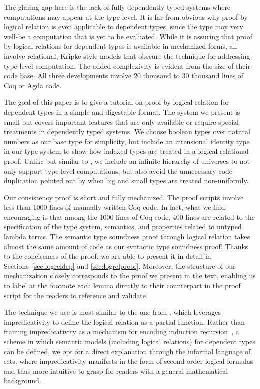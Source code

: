 \documentclass[acmsmall]{acmart}
\begin{document}
The glaring gap here is the
lack of fully dependently typed systems where computations may appear
at the type-level. It is far from obvious why proof by
logical relation is even applicable to dependent types, since the type
may very well-be a computation that is yet to be evaluated.
While it is assuring that proof by logical relations for dependent
types is available in mechanized forms, %
\citet{nbeincoq,decagda,martin-lof-a-la-coq} all involve relational,
Kripke-style models that obscure the technique for addressing
type-level computation. The added complexivity is evident
from the size of their code base. All three developments involve 20
thousand to 30 thousand lines of Coq or Agda code.

The goal of this paper is to give a tutorial on proof by logical relation for
dependent types in a simple and digestable format.
The system we present is small but covers
important features that are only available or require special treatments in
dependently typed systems. We choose boolean
types over natural numbers as our base type for simplicity, but include an
intensional identity type in our type system to show how indexed
types are treated in a logical relational proof. Unlike
\citet{nbeincoq,decagda,martin-lof-a-la-coq} but similar to
\citet{anand2014towards}, we include an infinite hierarchy of
universes to not only support type-level computations, but also avoid
the unnecessary code duplication pointed out by \citet{nbeincoq} when
big and small types are treated non-uniformly.

Our consistency proof is short and fully mechanized. The proof scripts
involve less than 1000 lines of manually written Coq code. In fact, what we find
encouraging is that among the 1000
lines of Coq code, 400 lines are related to the specification of the
type system, semantics, and properties related to untyped lambda
terms. The semantic type soundness proof through logical relation
takes almost the same amount of code as our syntactic type soundness
proof!
Thanks to the conciseness of
the proof, we are able to present it in detail in
Sections~\ref{sec:logreldep} and \ref{sec:logrelproof}. Moreover, the
structure of our mechanization closely corresponds to the proof we
present in the text, enabling us to label at the footnote each lemma
directly to their counterpart in the proof script for the readers to
reference and validate.

The technique we use is most similar to the one from \citet{nbeincoq},
which leverages impredicativity to define the logical
relation as a partial function.
Rather than framing impredicativity as a
mechanism for encoding induction
recursion~\citep{induction-recursion-dybjer}, a scheme in which
semantic models (including logical relations) for dependent types can
be defined, we opt for a direct explanation through the informal
language of sets, where impredicativity manifests in the form of
second-order logical formulas and thus more intuitive to grasp
for readers with a general mathematical background.
\end{document}

